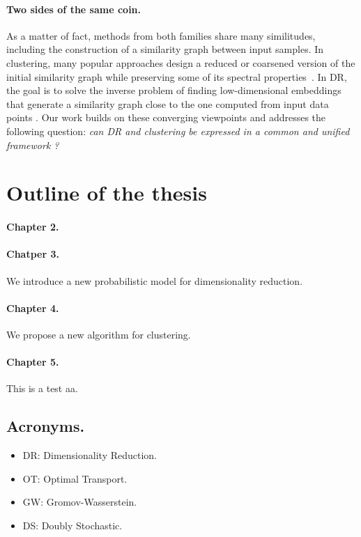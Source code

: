 \paragraph{Two sides of the same coin.} As a matter of fact, methods from both families share many similitudes, %
including the construction of a similarity graph between input samples. In clustering, many popular approaches design a reduced or coarsened version of the initial similarity graph while preserving some of its spectral properties~\citep{von2007tutorial, schaeffer2007graph}. 
In DR, the goal is to solve the inverse problem of finding low-dimensional embeddings that generate a similarity graph close to the %
one computed from input data points \citep{ham2004kernel,hinton2002stochastic}.
Our work builds on these converging viewpoints and addresses the following question: \emph{can DR and clustering  be expressed in a common and unified framework ?}


\section*{Outline of the thesis}

\paragraph{Chapter 2.}

\paragraph{Chatper 3.} We introduce a new probabilistic model for dimensionality reduction.

\paragraph{Chapter 4.} We propose a new algorithm for clustering.


\paragraph{Chapter 5.} 

\text


\begin{rem2}
	This is a test aa.
\end{rem2}




\subsection*{Acronyms.}
\begin{itemize}
	\item DR: Dimensionality Reduction.
	\item OT: Optimal Transport.
	\item GW: Gromov-Wasserstein.
	\item DS: Doubly Stochastic.
\end{itemize}